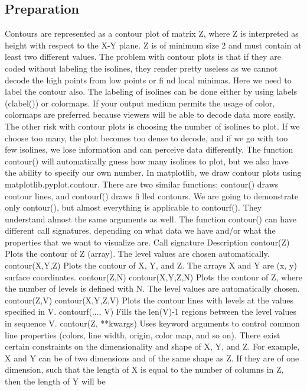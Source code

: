 \subsection{Preparation}
Contours are represented as a contour plot of matrix Z, where Z is interpreted as height
with respect to the X-Y plane. Z is of minimum size 2 and must contain at least two
different values.
The problem with contour plots is that if they are coded without labeling the isolines,
they render pretty useless as we cannot decode the high points from low points or fi nd
local minimas.
Here we need to label the contour also. The labeling of isolines can be done either by
using labels (clabel()) or colormaps. If your output medium permits the usage of
color, colormaps are preferred because viewers will be able to decode data more easily.
The other risk with contour plots is choosing the number of isolines to plot. If we choose
too many, the plot becomes too dense to decode, and if we go with too few isolines,
we lose information and can perceive data differently.
The function contour() will automatically guess how many isolines to plot, but we also have
the ability to specify our own number.
In matplotlib, we draw contour plots using matplotlib.pyplot.contour.
There are two similar functions: contour() draws contour lines, and contourf() draws
fi lled contours. We are going to demonstrate only contour(), but almost everything is
applicable to contourf(). They understand almost the same arguments as well.
The function contour() can have different call signatures, depending on what data we have
and/or what the properties that we want to visualize are.
Call signature Description
contour(Z) Plots the contour of Z (array). The level values are chosen
automatically.
contour(X,Y,Z) Plots the contour of X, Y, and Z. The arrays X and Y are (x, y)
surface coordinates.
 contour(Z,N)
contour(X,Y,Z,N)
Plots the contour of Z, where the number of levels is defined
with N. The level values are automatically chosen.
contour(Z,V)
contour(X,Y,Z,V)
Plots the contour lines with levels at the values specified in V.
contourf(..., V) Fills the len(V)-1 regions between the level values in
sequence V.
contour(Z, **kwargs) Uses keyword arguments to control common line properties
(colors, line width, origin, color map, and so on).
There exist certain constraints on the dimensionality and shape of X, Y, and Z. For example,
X and Y can be of two dimensions and of the same shape as Z. If they are of one dimension,
such that the length of X is equal to the number of columns in Z, then the length of Y will be
